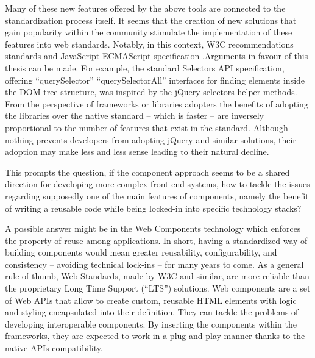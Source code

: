 Many of these new features offered by the above tools are connected to the standardization process itself. It seems that the creation of new solutions that gain popularity within the community stimulate the implementation of these features into web standards. Notably, in this context, W3C recommendations standards and JavaScript ECMAScript specification .Arguments in favour of this thesis can be made. For example, the standard Selectors API specification, offering “querySelector” “querySelectorAll” interfaces for finding elements inside the DOM tree structure, was inspired by the jQuery selectors helper methods. From the perspective of frameworks or libraries adopters the benefits of adopting the libraries over the native standard – which is faster – are inversely proportional to the number of features that exist in the standard. Although nothing prevents developers from adopting jQuery and similar solutions, their adoption may make less and less sense leading to their natural decline.

This prompts the question, if the component approach seems to be a shared direction for developing more complex front-end systems, how to tackle the issues regarding supposedly one of the main features of components, namely the benefit of writing a reusable code while being locked-in into specific technology stacks?

A possible answer might be in the Web Components technology which enforces the property of reuse among applications. In short, having a standardized way of building components would mean greater reusability, configurability, and consistency – avoiding technical lock-ins – for many years to come. As a general rule of thumb, Web Standards, made by W3C and similar, are more reliable than the proprietary Long Time Support (“LTS”) solutions. Web components are a set of Web APIs that allow to create custom, reusable HTML elements with logic and styling encapsulated into their definition. They can tackle the problems of developing interoperable components. By inserting the components within the frameworks, they are expected to work in a plug and play manner thanks to the native APIs compatibility.

